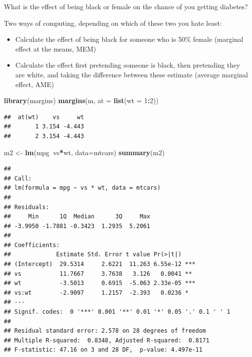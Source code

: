 \documentclass[]{article}
\newenvironment{Shaded}{\begin{snugshade}}{\end{snugshade}}
\newcommand{\KeywordTok}[1]{\textcolor[rgb]{0.13,0.29,0.53}{\textbf{#1}}}
\newcommand{\DataTypeTok}[1]{\textcolor[rgb]{0.13,0.29,0.53}{#1}}
\newcommand{\DecValTok}[1]{\textcolor[rgb]{0.00,0.00,0.81}{#1}}
\newcommand{\StringTok}[1]{\textcolor[rgb]{0.31,0.60,0.02}{#1}}
\newcommand{\OperatorTok}[1]{\textcolor[rgb]{0.81,0.36,0.00}{\textbf{#1}}}
\newcommand{\NormalTok}[1]{#1}
\providecommand{\tightlist}{%
  \setlength{\itemsep}{0pt}\setlength{\parskip}{0pt}}
\theoremstyle{definition}
\theoremstyle{definition}
\theoremstyle{definition}
\theoremstyle{remark}
\begin{document}
What is the effect of being black or female on the chance of you getting
diabetes?

Two ways of computing, depending on which of these two you hate least:

\begin{itemize}
\tightlist
\item
  Calculate the effect of being black for someone who is 50\% female
  (marginal effect at the means, MEM)
\item
  Calculate the effect first pretending someone is black, then
  pretending they are white, and taking the difference between these
  estimate (average marginal effect, AME)
\end{itemize}

\begin{Shaded}
\begin{Highlighting}[]
\KeywordTok{library}\NormalTok{(margins)}
\KeywordTok{margins}\NormalTok{(m, }\DataTypeTok{at =} \KeywordTok{list}\NormalTok{(}\DataTypeTok{wt =} \DecValTok{1}\OperatorTok{:}\DecValTok{2}\NormalTok{))}
\end{Highlighting}
\end{Shaded}

\begin{verbatim}
##  at(wt)    vs     wt
##       1 3.154 -4.443
##       2 3.154 -4.443
\end{verbatim}

\begin{Shaded}
\begin{Highlighting}[]
\NormalTok{m2 <-}\StringTok{ }\KeywordTok{lm}\NormalTok{(mpg}\OperatorTok{~}\NormalTok{vs}\OperatorTok{*}\NormalTok{wt, }\DataTypeTok{data=}\NormalTok{mtcars)}
\KeywordTok{summary}\NormalTok{(m2)}
\end{Highlighting}
\end{Shaded}

\begin{verbatim}
## 
## Call:
## lm(formula = mpg ~ vs * wt, data = mtcars)
## 
## Residuals:
##     Min      1Q  Median      3Q     Max 
## -3.9950 -1.7881 -0.3423  1.2935  5.2061 
## 
## Coefficients:
##             Estimate Std. Error t value Pr(>|t|)    
## (Intercept)  29.5314     2.6221  11.263 6.55e-12 ***
## vs           11.7667     3.7638   3.126   0.0041 ** 
## wt           -3.5013     0.6915  -5.063 2.33e-05 ***
## vs:wt        -2.9097     1.2157  -2.393   0.0236 *  
## ---
## Signif. codes:  0 '***' 0.001 '**' 0.01 '*' 0.05 '.' 0.1 ' ' 1
## 
## Residual standard error: 2.578 on 28 degrees of freedom
## Multiple R-squared:  0.8348, Adjusted R-squared:  0.8171 
## F-statistic: 47.16 on 3 and 28 DF,  p-value: 4.497e-11
\end{verbatim}
\end{document}
